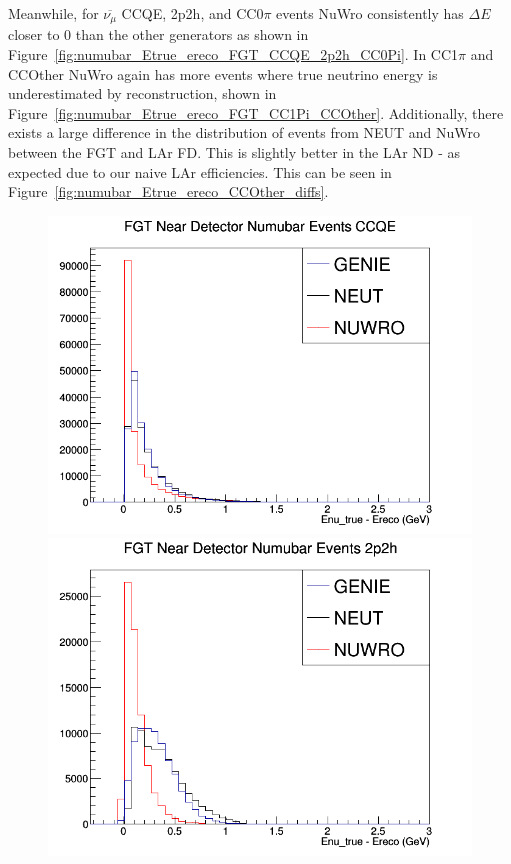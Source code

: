 \documentclass[12pt]{article}
\begin{document}
Meanwhile, for $\overline{\nu_\mu}$ CCQE, 2p2h, and CC0$\pi$ events NuWro consistently has $\Delta E$ closer to 0 than the other generators as shown in Figure~\ref{fig:numubar_Etrue_ereco_FGT_CCQE_2p2h_CC0Pi}. In CC1$\pi$ and CCOther NuWro again has more events where true neutrino energy is underestimated by reconstruction, shown in Figure~\ref{fig:numubar_Etrue_ereco_FGT_CC1Pi_CCOther}. Additionally, there exists a large difference in the distribution of events from NEUT and NuWro between the FGT and LAr FD. This is slightly better in the LAr ND - as expected due to our naive LAr efficiencies. This can be seen in Figure~\ref{fig:numubar_Etrue_ereco_CCOther_diffs}.
\begin{figure}[h]
\centering
{}
\includegraphics[width=\linewidth]{Ereco_Etrue/numubar_FGT_CCQE.png}
\endminipage
{}
\includegraphics[width=\linewidth]{Ereco_Etrue/numubar_FGT_2p2h.png}

\end{figure}
\end{document}
